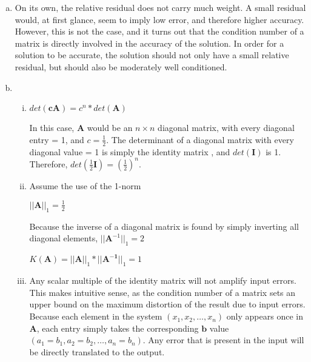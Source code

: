 \documentclass[11pt]{article}
\begin{document}
\begin{enumerate}
\begin{enumerate}[(a)]
		\item On its own, the relative residual does not carry much weight. A small residual would, at first glance, seem to imply low
		error, and therefore higher accuracy. However, this is not the case, and it turns out that the condition number of a matrix is
		directly involved in the accuracy of the solution. In order for a solution to be accurate, the solution should not only have
		a small relative residual, but should also be moderately well conditioned. \\

		\item
			\begin{enumerate}[i.]

				\item $det(\mathbf{cA}) = c^n*det(\mathbf{A})$

				In this case, $\mathbf{A}$ would be an $n\times n$ diagonal matrix, with every diagonal entry = 1, and $c =
				\frac{1}{2}$. The determinant of a diagonal matrix with every diagonal value = 1 is simply the identity matrix
				, and $det(\mathbf{I})$ is 1. Therefore, $det(\frac{1}{2}\mathbf{I}) =
				(\frac{1}{2})^n$. \\

				\item Assume the use of the 1-norm

				$||\mathbf{A}||_1 = \frac{1}{2}$

				Because the inverse of a diagonal matrix is found by simply inverting all diagonal elements, $||\mathbf{A}^{-1}
				||_1 = 2$

				$ K(\mathbf{A}) = ||\mathbf{A}||_1 * ||\mathbf{A^{-1}}||_1 = 1$ \\

				\item Any scalar multiple of the identity matrix will not amplify input errors. This makes intuitive sense, as
				the condition number of a matrix sets an upper bound on the maximum distortion of the result due to input
				errors. Because each element in the system $(x_1, x_2, \dots, x_n)$ only appears once in $\mathbf{A}$,
				each entry simply takes the corresponding $\mathbf{b}$ value $(a_1 = b_1, a_2 = b_2, \dots, a_n = b_n)$.
				Any error that is present in the input will be directly translated to the output. \\

			\end{enumerate}

	\end{enumerate}


\end{enumerate}
\end{document}

